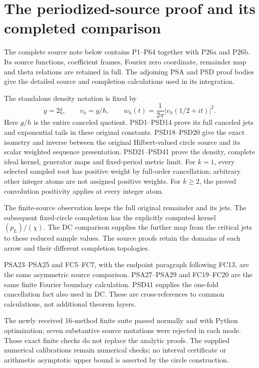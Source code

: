 \section{The periodized-source proof and its completed comparison}
\label{sec:periodized-source-reader-scope}

The complete source note below contains P1--P64 together with P26a
and P26b. Its source functions, coefficient frames, Fourier zero
coordinate, remainder map and theta relations are retained in full.
The adjoining PSA and PSD proof bodies give the detailed source and
completion calculations used in its integration.

The standalone density notation is fixed by
\[
 g=2\xi,\qquad v_h=g/h,\qquad
 w_h(t)=\frac1{2\pi}|v_h(1/2+it)|^2.
\]
Here $g/h$ is the entire canceled quotient. PSD1--PSD14 prove its
full canceled jets and exponential tails in these original constants.
PSD18--PSD20 give the exact isometry and inverse between the original
Hilbert-valued circle source and its scalar weighted sequence
presentation. PSD21--PSD41 prove the density, complete ideal kernel,
generator maps and fixed-period metric limit. For $k=1$, every selected
sampled root has positive weight by full-order cancellation; arbitrary
other integer atoms are not assigned positive weights. For $k\ge2$,
the proved convolution positivity applies at every integer atom.

The finite-source observation keeps the full original remainder and
its jets. The subsequent fixed-circle completion has the explicitly
computed kernel $(p_L)/(\chi)$. The DC comparison supplies the further
map from the critical jets to these reduced sample values. The source
proofs retain the domains of each arrow and their different completion
topologies.

PSA23--PSA25 and FC5--FC7, with the endpoint paragraph following
FC13, are the same asymmetric source comparison. PSA27--PSA29 and
FC19--FC20 are the same finite Fourier boundary calculation. PSD41
supplies the one-fold cancellation fact also used in DC. These are
cross-references to common calculations, not additional theorem layers.

The newly received 16-method finite suite passed normally and with
Python optimization; seven substantive source mutations were rejected
in each mode. Those exact finite checks do not replace the analytic
proofs. The supplied numerical calibrations remain numerical checks;
no interval certificate or arithmetic asymptotic upper bound is
asserted by the circle construction.

